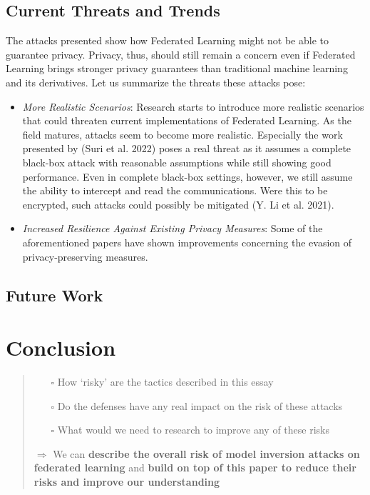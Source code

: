\hypertarget{current-threats-and-trends}{%
\subsection{Current Threats and
Trends}\label{current-threats-and-trends}}

The attacks presented show how Federated Learning might not be able to
guarantee privacy. Privacy, thus, should still remain a concern even if
Federated Learning brings stronger privacy guarantees than traditional
machine learning and its derivatives. Let us summarize the threats these
attacks pose:

\begin{itemize}
\item
  \emph{More Realistic Scenarios}: Research starts to introduce more
  realistic scenarios that could threaten current implementations of
  Federated Learning. As the field matures, attacks seem to become more
  realistic. Especially the work presented by (Suri et al. 2022) poses a
  real threat as it assumes a complete black-box attack with reasonable
  assumptions while still showing good performance. Even in complete
  black-box settings, however, we still assume the ability to intercept
  and read the communications. Were this to be encrypted, such attacks
  could possibly be mitigated (Y. Li et al. 2021).
\item
  \emph{Increased Resilience Against Existing Privacy Measures}: Some of
  the aforementioned papers have shown improvements concerning the
  evasion of privacy-preserving measures.
\end{itemize}

\hypertarget{future-work}{%
\subsection{Future Work}\label{future-work}}

\hypertarget{conclusion}{%
\section{Conclusion}\label{conclusion}}

\begin{quote}
\begin{itemize}
\tightlist
\item[$\square$]
  How `risky' are the tactics described in this essay
\item[$\square$]
  Do the defenses have any real impact on the risk of these attacks
\item[$\square$]
  What would we need to research to improve any of these risks
\end{itemize}

\(\Rightarrow\) We can \textbf{describe the overall risk of model
inversion attacks on federated learning} and \textbf{build on top of
this paper to reduce their risks and improve our understanding}
\end{quote}

